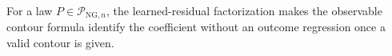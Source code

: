 For a law \(P\in\mathcal P_{\mathrm{NG},n}\), the learned-residual factorization makes the observable contour formula identify the coefficient without an outcome regression once a valid contour is given.